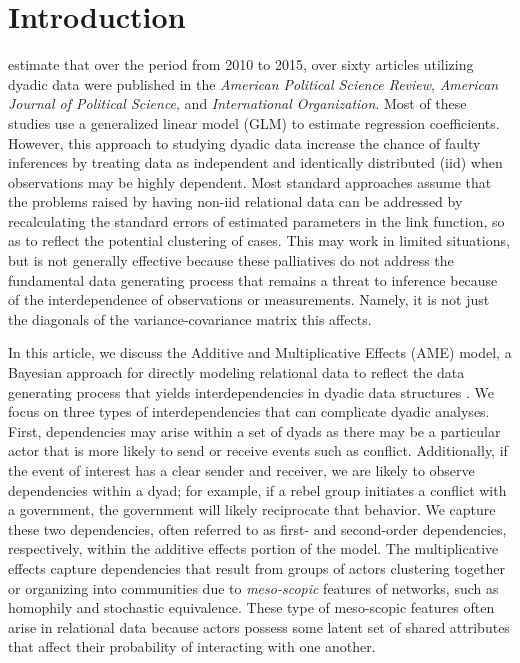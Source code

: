 \section{\textbf{Introduction}}

\citet{aronow:etal:2015} estimate that over the period from 2010 to 2015, over sixty articles utilizing dyadic data were published in the \textit{American Political Science Review}, \textit{American Journal of Political Science}, and \textit{International Organization}. Most of these studies use a generalized linear model (GLM) to estimate regression coefficients.  However, this approach to studying dyadic data increase the chance of faulty inferences by treating data as independent and identically distributed (iid) when observations may be highly dependent. Most standard approaches assume that the problems raised by having non-iid relational data can be addressed by recalculating the standard errors of estimated parameters in the link function, so as to reflect the potential clustering of cases. This may work in limited situations, but is not generally effective because these palliatives do not address the fundamental data generating process that remains a threat to inference because of the interdependence of observations or measurements. Namely, it is not just the diagonals of the variance-covariance matrix this affects. %

In this article, we discuss the Additive and Multiplicative Effects (AME) model, 
a Bayesian approach for directly modeling relational data to reflect the data generating process that yields interdependencies in dyadic data structures \citep{hoff:2008,minhas:etal:2016:arxiv}. We focus on three types of interdependencies that can complicate dyadic analyses. First, dependencies may arise within a set of dyads as there may be a particular actor that is more likely to send or receive events such as conflict. Additionally, if the event of interest has a clear sender and receiver, we are likely to observe dependencies within a dyad; for example, if a rebel group initiates a conflict with a government, the government will likely reciprocate that behavior. We capture these two dependencies, often referred to as first- and second-order dependencies, respectively, within the additive effects portion of the model. The multiplicative effects capture dependencies that result from groups of actors clustering together or organizing into communities due to \textit{meso-scopic} features of networks, such as homophily and stochastic equivalence. These type of meso-scopic features often arise in relational data because actors possess some latent set of shared attributes that affect their probability of interacting with one another. 

